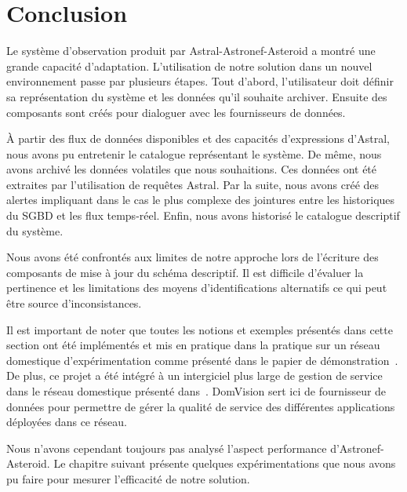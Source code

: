 \section{Conclusion}\label{sec:valid:domvision:conclusion}
Le système d'observation produit par Astral-Astronef-Asteroid a montré une grande capacité d'adaptation. L'utilisation de notre solution dans un nouvel environnement passe par plusieurs étapes. Tout d'abord, l'utilisateur doit définir sa représentation du système et les données qu'il souhaite archiver. Ensuite des composants sont créés pour dialoguer avec les fournisseurs de données.

À partir des flux de données disponibles et des capacités d'expressions d'Astral, nous avons pu entretenir le catalogue représentant le système. De même, nous avons archivé les données volatiles que nous souhaitions. Ces données ont été extraites par l'utilisation de requêtes Astral. Par la suite, nous avons créé des alertes impliquant dans le cas le plus complexe des jointures entre les historiques du SGBD et les flux temps-réel. Enfin, nous avons historisé le catalogue descriptif du système.

Nous avons été confrontés aux limites de notre approche lors de l'écriture des composants de mise à jour du schéma descriptif. Il est difficile d'évaluer la pertinence et les limitations des moyens d'identifications alternatifs ce qui peut être source d'inconsistances.

Il est important de noter que toutes les notions et exemples présentés dans cette section ont été implémentés et mis en pratique dans la pratique sur un réseau domestique d'expérimentation comme présenté dans le papier de démonstration~\cite{Petit:domvision}. De plus, ce projet a été intégré à un intergiciel plus large de gestion de service dans le réseau domestique présenté dans~\cite{Kaed:insight}. DomVision sert ici de fournisseur de données pour permettre de gérer la qualité de service des différentes applications déployées dans ce réseau.

Nous n'avons cependant toujours pas analysé l'aspect performance d'Astronef-Asteroid. Le chapitre suivant présente quelques expérimentations que nous avons pu faire pour mesurer l'efficacité de notre solution.
